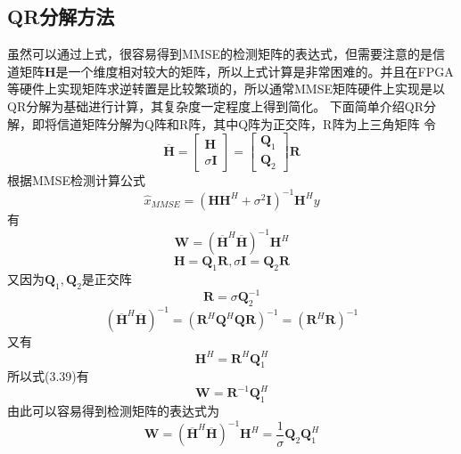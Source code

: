 \documentclass[bachelor,nocolorlinks, printoneside]{seuthesis} %
\begin{document}
\begin{Main}
\section{QR分解方法}
虽然可以通过上式，很容易得到MMSE的检测矩阵的表达式，但需要注意的是信道矩阵$\mathbf{H}$是一个维度相对较大的矩阵，所以上式计算是非常困难的。并且在FPGA等硬件上实现矩阵求逆转置是比较繁琐的，所以通常MMSE矩阵硬件上实现是以QR分解为基础进行计算，其复杂度一定程度上得到简化。
下面简单介绍QR分解，即将信道矩阵分解为Q阵和R阵，其中Q阵为正交阵，R阵为上三角矩阵
令
\begin{equation}\label{key}
\overline{\mathbf{H}} = \left[
\begin{array}{c}
\mathbf{H}\\
\sigma \mathbf{I}
\end{array} \right] =
\left[
\begin{array}{c}
\mathbf{Q}_1\\
\mathbf{Q}_2
\end{array} \right] \mathbf{R}
\end{equation}
根据MMSE检测计算公式
\begin{equation}\label{key}
\hat{x}_{MMSE} = (\mathbf{H}\mathbf{H}^H + \sigma^2 \mathbf{I})^{-1}\mathbf{H}^H y
\end{equation}
有
\begin{equation}\label{key}
\mathbf{W}=(\overline{\mathbf{H}}^H \overline{\mathbf{H}})^{-1} \mathbf{H}^H
\end{equation}
\begin{equation}\label{key}
\mathbf{H} = \mathbf{Q}_1 \mathbf{R} ,\sigma\mathbf{I} = \mathbf{Q}_2\mathbf{R}
\end{equation}
又因为$\mathbf{Q}_1,\mathbf{Q}_2$是正交阵
\begin{equation}\label{key}
\mathbf{R} = \sigma \mathbf{Q}_2^{-1}
\end{equation}
\begin{equation}\label{key}
(\overline{\mathbf{H}}^H \overline{\mathbf{H}})^{-1} = (\mathbf{R}^H \mathbf{Q}^H\mathbf{Q} \mathbf{R})^{-1} =(\mathbf{R}^H \mathbf{R})^{-1}
\end{equation}
又有
\begin{equation}\label{key}
\mathbf{H}^{H} =\mathbf{R}^{H} \mathbf{Q}_1^H 
\end{equation}
所以式(3.39)有
\begin{equation}\label{key}
\mathbf{W} = \mathbf{R}^{-1} \mathbf{Q}_1^H
\end{equation}
由此可以容易得到检测矩阵的表达式为
\begin{equation}\label{key}
\mathbf{W}=(\overline{\mathbf{H}}^H \overline{\mathbf{H}})^{-1} \mathbf{H}^H = \frac{1}{\sigma} \mathbf{Q}_2 \mathbf{Q}_1^H
\end{equation}


\end{Main}
\end{document}
